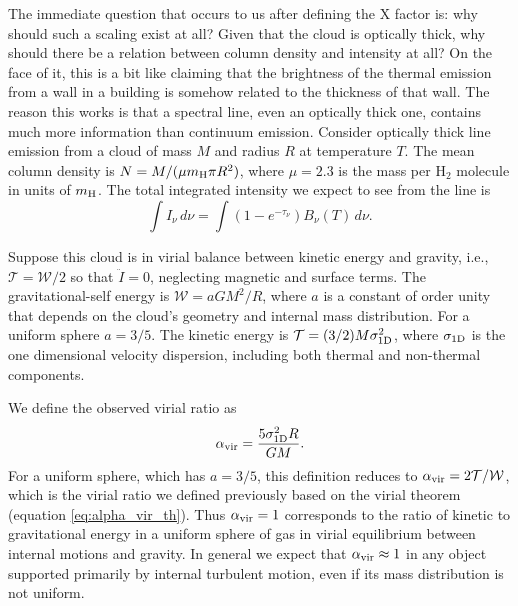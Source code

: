 The immediate question that occurs to us after defining the X factor is: why should such a scaling exist at all? Given that the cloud is optically thick, why should there be a relation between column density and intensity at all? On the face of it, this is a bit like claiming that the brightness of the thermal emission from a wall in a building is somehow related to the thickness of that wall. The reason this works is that a spectral line, even an optically thick one, contains much more information than continuum emission. Consider optically thick line emission from a cloud of mass $M$ and radius $R$ at temperature $T$. The mean column density is $N= M/(\mu m_{\rm H} \pi R^2)$, where $\mu=2.3$ is the mass per H$_2$ molecule in units of $m_{\rm H}$. The total integrated intensity we expect to see from the line is
\begin{equation}
\int I_{\nu}\, d\nu = \int (1 - e^{-\tau_{\nu}}) B_{\nu}(T)\,d\nu.
\end{equation}

Suppose this cloud is in virial balance between kinetic energy and gravity, i.e., $\mathcal{T}=\mathcal{W}/2$ so that $\ddot{I}=0$, neglecting magnetic and surface terms. The gravitational-self energy is $\mathcal{W}=a GM^2/R$, where $a$ is a constant of order unity that depends on the cloud's geometry and internal mass distribution. For a uniform sphere $a=3/5$. The kinetic energy is $\mathcal{T}=(3/2)M\sigma_{\rm 1D}^2$, where $\sigma_{\rm 1D}$ is the one dimensional velocity dispersion, including both thermal and non-thermal components.

We define the observed virial ratio as
\begin{equation}
\label{eq:alpha_vir_obs}
\avir =  \frac{5\sigma_{\rm 1D}^2 R}{GM}.
\end{equation}
For a uniform sphere, which has $a=3/5$, this definition reduces to $\alpha_{\mathrm{vir}}=2\mathcal{T}/\mathcal{W}$, which is the virial ratio we defined previously based on the virial theorem (equation \ref{eq:alpha_vir_th}). Thus $\alpha_{\mathrm{vir}}=1$ corresponds to the ratio of kinetic to gravitational energy in a uniform sphere of gas in virial equilibrium between internal motions and gravity. In general we expect that $\alpha_{\mathrm{vir}}\approx 1$ in any object supported primarily by internal turbulent motion, even if its mass distribution is not uniform.

